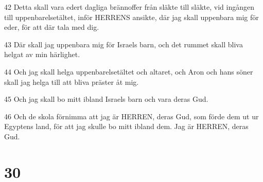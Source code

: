 \par 42 Detta skall vara edert dagliga brännoffer från släkte till släkte, vid ingången till uppenbarelsetältet, inför HERRENS ansikte, där jag skall uppenbara mig för eder, för att där tala med dig.
\par 43 Där skall jag uppenbara mig för Israels barn, och det rummet skall bliva helgat av min härlighet.
\par 44 Och jag skall helga uppenbarelsetältet och altaret, och Aron och hans söner skall jag helga till att bliva präster åt mig.
\par 45 Och jag skall bo mitt ibland Israels barn och vara deras Gud.
\par 46 Och de skola förnimma att jag är HERREN, deras Gud, som förde dem ut ur Egyptens land, för att jag skulle bo mitt ibland dem. Jag är HERREN, deras Gud.

\chapter{30}

